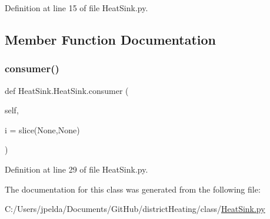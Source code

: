 Definition at line 15 of file Heat\+Sink.\+py.



\subsection{Member Function Documentation}
\mbox{\label{class_heat_sink_1_1_heat_sink_a10c8205c614c016c724f51c350b6ec18}} 
\subsubsection{\texorpdfstring{consumer()}{consumer()}}
{\footnotesize\ttfamily def Heat\+Sink.\+Heat\+Sink.\+consumer (\begin{DoxyParamCaption}\item[{}]{self,  }\item[{}]{i = {\ttfamily slice(None,None)} }\end{DoxyParamCaption})}



Definition at line 29 of file Heat\+Sink.\+py.



The documentation for this class was generated from the following file\+:\begin{DoxyCompactItemize}
\item 
C\+:/\+Users/jpelda/\+Documents/\+Git\+Hub/district\+Heating/class/\hyperlink{_heat_sink_8py}{Heat\+Sink.\+py}\end{DoxyCompactItemize}
